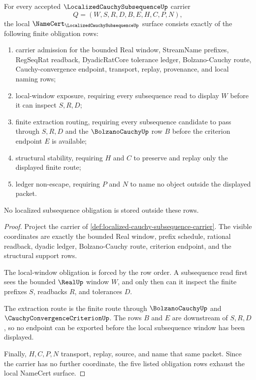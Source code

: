 \begin{theorem}
\label{thm:localized-cauchy-subsequence-namecert-obligations}
For every accepted $\LocalizedCauchySubsequenceUp$ carrier
$$
Q=(W,S,R,D,B,E,H,C,P,N),
$$
the local $\NameCert_{\LocalizedCauchySubsequenceUp}$ surface consists exactly of the following finite obligation rows:
\begin{enumerate}
\item carrier admission for the bounded Real window, StreamName prefixes, RegSeqRat readback, DyadicRatCore tolerance ledger, Bolzano-Cauchy route, Cauchy-convergence endpoint, transport, replay, provenance, and local naming rows;
\item local-window exposure, requiring every subsequence read to display $W$ before it can inspect $S,R,D$;
\item finite extraction routing, requiring every subsequence candidate to pass through $S,R,D$ and the $\BolzanoCauchyUp$ row $B$ before the criterion endpoint $E$ is available;
\item structural stability, requiring $H$ and $C$ to preserve and replay only the displayed finite route;
\item ledger non-escape, requiring $P$ and $N$ to name no object outside the displayed packet.
\end{enumerate}
No localized subsequence obligation is stored outside these rows.
\end{theorem}
\begin{proof}
Project the carrier of \autoref{def:localized-cauchy-subsequence-carrier}. The visible coordinates are exactly the bounded Real window, prefix schedule, rational readback, dyadic ledger, Bolzano-Cauchy route, criterion endpoint, and the structural support rows.

The local-window obligation is forced by the row order. A subsequence read first sees the bounded $\RealUp$ window $W$, and only then can it inspect the finite prefixes $S$, readbacks $R$, and tolerances $D$.

The extraction route is the finite route through $\BolzanoCauchyUp$ and $\CauchyConvergenceCriterionUp$. The rows $B$ and $E$ are downstream of $S,R,D$, so no endpoint can be exported before the local subsequence window has been displayed.

Finally, $H,C,P,N$ transport, replay, source, and name that same packet. Since the carrier has no further coordinate, the five listed obligation rows exhaust the local NameCert surface.
\end{proof}

